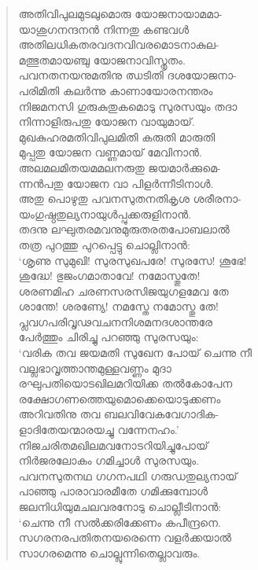 \begin{verse}
അതിവിപുലമുടലുമൊരു യോജനായാമമാ-\\
യാശുഗനന്ദനന്‍ നിന്നതു കണ്ടവള്‍\\
അതിലധികതരവദനവിവരമൊടനാകുല-\\
മത്ഭുതമായഞ്ചു യോജനാവിസ്തൃതം.\\
പവനതനയനുമതിനു ഝടിതി ദശയോജനാ-\\
പരിമിതി കലര്‍ന്നു കാണായോരനന്തരം\\
നിജമനസി ഗുരുകുതുകമൊടു സുരസയും തദാ\\
നിന്നാളിരുപതു യോജന വായുമായ്.\\
മുഖകുഹരമതിവിപുലമിതി കരുതി മാരുതി\\
മുപ്പതു യോജന വണ്ണമായ് മേവിനാന്‍.\\
അലമലമിതയമമലനരുതു ജയമാര്‍ക്കുമെ-\\
ന്നന്‍പതു യോജന വാ പിളര്‍ന്നീടിനാള്‍.\\
അതു പൊഴുതു പവനസുതനതികൃശ ശരീരനാ-\\
യംഗുഷ്ഠതുല്യനായുള്‍പ്പുക്കരുളിനാന്‍.\\
തദനു ലഘുതരമവനുമുരുതരതപോബലാല്‍\\
തത്ര പുറത്തു പുറപ്പെട്ടു ചൊല്ലിനാന്‍:\\
‘ശൃണു സുമുഖി! സുരസുഖപരേ! സുരസേ! ശൂഭേ!\\
ശുദ്ധേ! ഭുജംഗമാതാവേ! നമോസ്തുതേ!\\
ശരണമിഹ ചരണസരസിജയുഗളമേവ തേ\\
ശാന്തേ! ശരണ്യേ! നമസ്തേ നമോസ്തു തേ!\\
പ്ലവഗപരിവൃഢവചനനിശമനദശാന്തരേ\\
പേര്‍ത്തും ചിരിച്ചു പറഞ്ഞു സുരസയും:\\
‘വരിക തവ ജയമതി സുഖേന പോയ് ചെന്നു നീ\\
വല്ലഭാവൃത്താന്തമുള്ളവണ്ണം മുദാ\\
രഘുപതിയൊടഖിലമറിയിക്ക തല്‍കോപേന\\
രക്ഷോഗണത്തെയുമൊക്കെയൊടുക്കണം\\
അറിവതിനു തവ ബലവിവേകവേഗാദിക-\\
ളാദിതേയന്മാരയച്ചു വന്നേനഹം.’\\
നിജചരിതമഖിലമവനോടറിയിച്ചുപോയ്\\
നിര്‍ജരലോകം ഗമിച്ചാള്‍ സുരസയും.\\
പവനസുതനഥ ഗഗനപഥി ഗരുഡതുല്യനായ്\\
പാഞ്ഞു പാരാവാരമീതേ ഗമിക്കുമ്പോള്‍\\
ജലനിധിയുമചലവരനോടു ചൊല്ലീടിനാന്‍:\\
‘ചെന്നു നീ സല്‍ക്കരിക്കേണം കപീന്ദ്രനെ.\\
സഗരനരപതിതനയരെന്നെ വളര്‍ക്കയാല്‍\\
സാഗരമെന്നു ചൊല്ലുന്നിതെല്ലാവരും.\\

\end{verse}
